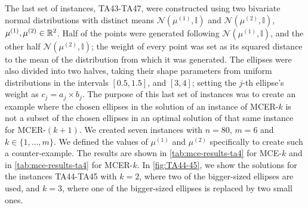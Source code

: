 The last set of instances, TA43-TA47, were constructed using two bivariate normal distributions with distinct means $\mathcal{N}(\mu^{(1)}, \mathbb{I})$ and $\mathcal{N}(\mu^{(2)}, \mathbb{I})$, $\mu^{(1)}, \mu^{(2)} \in \mathbb{R}^2$. Half of the points were generated following $\mathcal{N}(\mu^{(1)}, \mathbb{I})$, and the other half $\mathcal{N}(\mu^{(2)}, \mathbb{I})$; the weight of every point was set as its squared distance to the mean of the distribution from which it was generated.
The ellipses were also divided into two halves, taking their shape parameters from uniform distributions in the intervals $[0.5, 1.5]$, and $[3, 4]$; setting the $j$-th ellipse's weight as $c_j=a_j \times b_j$.
The purpose of this last set of instances was to create an example where the chosen ellipses in the solution of an instance of MCER-$k$ is not a subset of the chosen ellipses in an optimal solution of that same instance for MCER-$(k+1)$. We created seven instances with $n=80$, $m=6$ and $k\in\{1, \dots, m\}$. We defined the values of $\mu^{(1)}$ and $\mu^{(2)}$ specifically to create such a counter-example. The results are shown in \autoref{tab:mce-results-ta4} for MCE-$k$ and in \autoref{tab:mce-results-ta4} for MCER-$k$.
In \autoref{fig:TA44-45}, we show the solutions for the instances TA44-TA45 with $k=2$, where two of the bigger-sized ellipses are used, and $k=3$, where one of the bigger-sized ellipses is replaced by two small ones.

